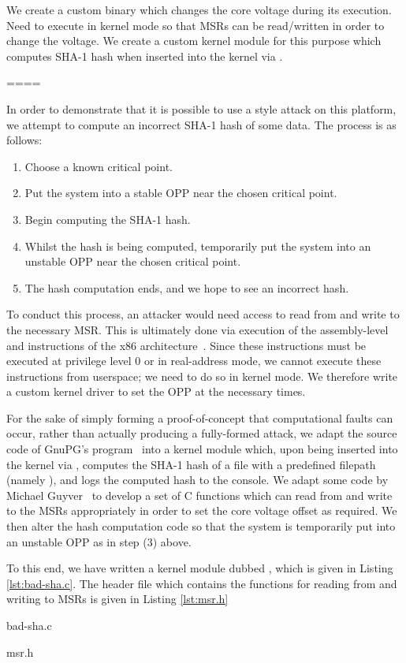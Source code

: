 We create a custom  binary which changes the core voltage during its
execution.
Need to execute in kernel mode so that MSRs can be read/written in order to
change the voltage.
We create a custom kernel module for this purpose which computes SHA-1 hash
when inserted into the kernel via .

====

In order to demonstrate that it is possible to use a \clkscrew{} style attack
on this platform, we attempt to compute an incorrect SHA-1 hash of some data.
The process is as follows:

\begin{enumerate}
    \item Choose a known critical point.
    \item Put the system into a stable OPP near the chosen critical point.
    \item Begin computing the SHA-1 hash.
    \item Whilst the hash is being computed, temporarily put the system into an
        unstable OPP near the chosen critical point.
    \item The hash computation ends, and we hope to see an incorrect hash.
\end{enumerate}

To conduct this process, an attacker would need access to read from and write to
the necessary MSR. This is ultimately done via execution of the assembly-level
 and  instructions of the x86
architecture~\cite[Vol. 2, §§4.3–4]{intelDevManual}. Since these instructions
must be executed at privilege level 0 or in real-address mode, we cannot
execute these instructions from userspace; we need to do so in kernel mode. We
therefore write a custom kernel driver to set the OPP at the necessary times.

For the sake of simply forming a proof-of-concept that computational faults can
occur, rather than actually producing a fully-formed attack, we adapt the source
code of GnuPG's  program~\cite{gnupgSHA} into a kernel module
which, upon being inserted into the kernel via , computes the
SHA-1 hash of a file with a predefined filepath (namely
), and logs the computed hash to the console. We
adapt some code by Michael Guyver~\cite{guyverCode} to develop a set of C
functions which can read from and write to the MSRs appropriately in order to
set the core voltage offset as required. We then alter the hash computation code
so that the system is temporarily put into an unstable OPP as in step (3) above.

To this end, we have written a kernel module dubbed , which is
given in Listing \ref{lst:bad-sha.c}. The header file  which
contains the functions for reading from and writing to MSRs is given in
Listing \ref{lst:msr.h}


    {bad-sha.c}


    {msr.h}
